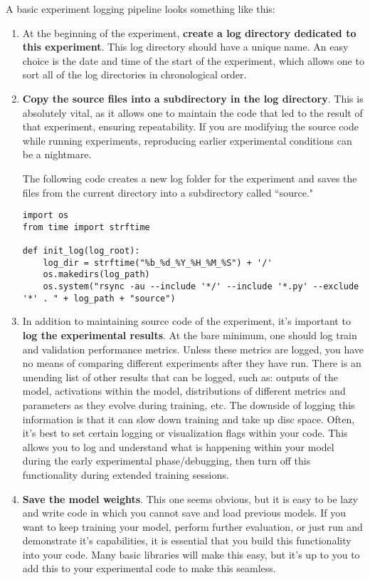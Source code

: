 A basic experiment logging pipeline looks something like this:

\begin{enumerate}
	\item At the beginning of the experiment, \textbf{create a log directory dedicated to this experiment}. This log directory should have a unique name. An easy choice is the date and time of the start of the experiment, which allows one to sort all of the log directories in chronological order.

	\item \textbf{Copy the source files into a subdirectory in the log directory}. This is absolutely vital, as it allows one to maintain the code that led to the result of that experiment, ensuring repeatability. If you are modifying the source code while running experiments, reproducing earlier experimental conditions can be a nightmare. 
	
	The following code creates a new log folder for the experiment and saves the files from the current directory into a subdirectory called ``source."

\begin{lstlisting}[style=python]
import os
from time import strftime

def init_log(log_root):
	log_dir = strftime("%b_%d_%Y_%H_%M_%S") + '/'
	os.makedirs(log_path)
    os.system("rsync -au --include '*/' --include '*.py' --exclude '*' . " + log_path + "source")
\end{lstlisting}

	\item In addition to maintaining source code of the experiment, it's important to \textbf{log the experimental results}. At the bare minimum, one should log train and validation performance metrics. Unless these metrics are logged, you have no means of comparing different experiments after they have run. There is an unending list of other results that can be logged, such as: outputs of the model, activations within the model, distributions of different metrics and parameters as they evolve during training, etc. The downside of logging this information is that it can slow down training and take up disc space. Often, it's best to set certain logging or visualization flags within your code. This allows you to log and understand what is happening within your model during the early experimental phase/debugging, then turn off this functionality during extended training sessions.
	
	\item \textbf{Save the model weights}. This one seems obvious, but it is easy to be lazy and write code in which you cannot save and load previous models. If you want to keep training your model, perform further evaluation, or just run and demonstrate it's capabilities, it is essential that you build this functionality into your code. Many basic libraries will make this easy, but it's up to you to add this to your experimental code to make this seamless.

\end{enumerate}

